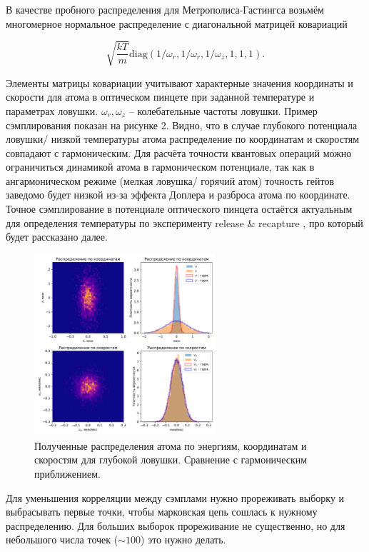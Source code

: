 В качестве пробного распределения для Метрополиса-Гастингса возьмём многомерное нормальное распределение с диагональной матрицей ковариаций

\begin{equation}
	\sqrt{\frac{kT}{m}}\text{diag}\left(1/\omega_r,1/\omega_r, 1/\omega_z, 1, 1, 1\right).
\end{equation}

Элементы матрицы ковариации учитывают характерные значения координаты и скорости для атома в оптическом пинцете при заданной температуре и параметрах ловушки. $\omega_r,\omega_z$ – колебательные частоты ловушки. Пример сэмплирования показан на рисунке 2. Видно, что в случае глубокого потенциала ловушки/ низкой температуры атома распределение по координатам и скоростям совпадают с гармоническим. 
Для расчёта точности квантовых операций можно ограничиться динамикой атома в гармоническом потенциале, так как в ангармоническом режиме (мелкая ловушка/ горячий атом) точность гейтов заведомо будет низкой из-за эффекта Доплера и разброса атома по координате. Точное сэмплирование в потенциале оптического пинцета остаётся актуальным для определения температуры по эксперименту release \& recapture \cite{Tuchendler2008EnergyDA}, про который будет рассказано далее. 

\begin{figure}[ht]
	\centering
	\includegraphics[width=0.6\textwidth]{images/mcmc.pdf}
	\caption{Полученные распределения атома по энергиям, координатам и скоростям для глубокой ловушки. Сравнение с гармоническим приближением.}
	\label{fig:mcmc_samples}
\end{figure}

Для уменьшения корреляции между сэмплами нужно прореживать выборку и выбрасывать первые точки, чтобы марковская цепь сошлась к нужному распределению. Для больших выборок прореживание не существенно, но для небольшого числа точек ($\sim 100$) это нужно делать.

